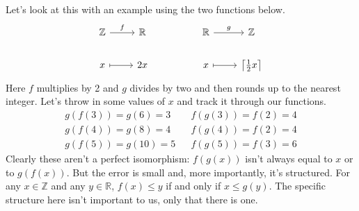 \documentclass[12pt]{article}
\newcounter{examp}
\begin{document}
Let's look at this with an example using the two functions below.
\[\begin{tikzcd}
        {\mathbb{Z}} & {\mathbb{R}} && {\mathbb{R}} & {\mathbb{Z}} \\
        x & 2x && x & {\big\lceil \frac{1}{2}x \big\rceil}
        \arrow["f", from=1-1, to=1-2]
        \arrow[maps to, from=2-1, to=2-2]
        \arrow["g", from=1-4, to=1-5]
        \arrow[maps to, from=2-4, to=2-5]
    \end{tikzcd}\]
Here $f$ multiplies by 2 and $g$ divides by two and then rounds up to the nearest integer.
Let's throw in some values of $x$ and track it through our functions.
\begin{align*}
    g(f(3))=g(6)=3  &  & f(g(3))=f(2)=4 \\
    g(f(4))=g(8)=4  &  & f(g(4))=f(2)=4 \\
    g(f(5))=g(10)=5 &  & f(g(5))=f(3)=6
\end{align*}
Clearly these aren't a perfect isomorphism: $f(g(x))$ isn't always equal to $x$ or to $g(f(x))$.
But the error is small and, more importantly, it's structured.
For any $x\in\mathbb{Z}$ and any $y\in\mathbb{R}$, $f(x) \le y$ if and only if $x \le g(y)$.
The specific structure here isn't important to us, only that there is one.
\end{document}
